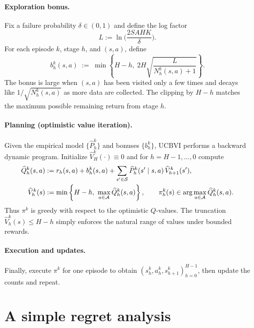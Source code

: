 \paragraph{Exploration bonus.}
Fix a failure probability $\delta\in(0,1)$ and define the log factor
\[
L := \ln\!\Big(\frac{2SAHK}{\delta}\Big).
\]
For each episode $k$, stage $h$, and $(s,a)$, define
\begin{equation}
\label{eq:ucbvi_bonus}
b_h^k(s,a)
\;:=\;
\min\left\{H-h,\; 2H\sqrt{\frac{L}{N_h^k(s,a)+1}}\right\}.
\end{equation}
The bonus is large when $(s,a)$ has been visited only a few times and decays like
$1/\sqrt{N_h^k(s,a)}$ as more data are collected. The clipping by $H-h$ matches the
maximum possible remaining return from stage $h$.

\paragraph{Planning (optimistic value iteration).}
Given the empirical model $\{\widehat P_h^k\}$ and bonuses $\{b_h^k\}$, UCBVI performs a
backward dynamic program. Initialize $\widehat V_H^k(\cdot)\equiv 0$ and for
$h=H-1,\dots,0$ compute
\begin{align}
\label{eq:ucbvi_vi}
\widehat Q_h^k(s,a)
&:= r_h(s,a) + b_h^k(s,a) + \sum_{s'\in\mathcal{S}}\widehat P_h^k(s'\mid s,a)\,\widehat V_{h+1}^k(s'),\\
\widehat V_h^k(s)
&:= \min\left\{H-h,\ \max_{a\in\mathcal{A}}\widehat Q_h^k(s,a)\right\},\qquad
\pi_h^k(s)\in\arg\max_{a\in\mathcal{A}}\widehat Q_h^k(s,a).\nonumber
\end{align}
Thus $\pi^k$ is greedy with respect to the optimistic $Q$-values. The truncation
$\widehat V_h^k(s)\le H-h$ simply enforces the natural range of values under bounded rewards.

\paragraph{Execution and updates.}
Finally, execute $\pi^k$ for one episode to obtain $(s_h^k,a_h^k,s_{h+1}^k)_{h=0}^{H-1}$,
then update the counts and repeat.


\section{A simple regret analysis}
\label{sec:tabular_ucbvi_analysis_simple}

